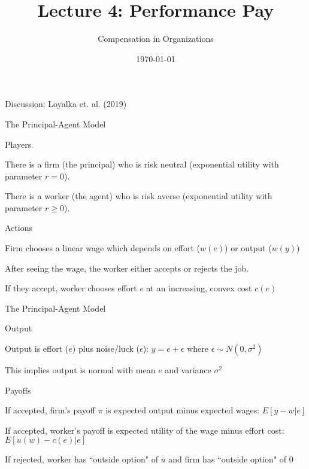 \documentclass[aspectratio=169,usenames,dvipsnames]{beamer}
\title[diss]{Lecture 4: Performance Pay} %
\author{Compensation in Organizations} %
\institute[shortinst]{Jacob Kohlhepp}
\date{\today} %
\newenvironment{wideitemize}{\itemize\addtolength{\itemsep}{10pt}}{\enditemize}
\begin{document}
\begin{frame}
\titlepage %

\end{frame}

\begin{frame}
\centering
    \huge Discussion: Loyalka et. al. (2019)
\end{frame}

\begin{frame}{The Principal-Agent Model}
\begin{block}{Players}
    \begin{wideitemize}
    \item There is a firm (the principal) who is risk neutral (exponential utility with parameter $r=0$).
    \item There is a worker (the agent) who is risk averse (exponential utility with parameter $r\geq 0$).
\end{wideitemize}
\end{block}
\begin{block}{Actions}
    \begin{wideitemize}
    \item Firm chooses a linear wage which depends on effort ($w(e)$) or output ($w(y)$)
    \item After seeing the wage, the worker either accepts or rejects the job.
    \item If they accept, worker chooses effort $e$ at an increasing, convex cost $c(e)$
\end{wideitemize}
\end{block}
\end{frame}
\begin{frame}{The Principal-Agent Model}
\begin{block}{Output}
    \begin{wideitemize}
    \item Output is effort ($e$) plus noise/luck ($\epsilon$): $y=e+\epsilon$ where $\epsilon\sim N(0,\sigma^2)$
    \item This implies output is normal with mean $e$ and variance $\sigma^2$
\end{wideitemize}
\end{block}
\begin{block}{Payoffs}
    \begin{wideitemize}
    \item If accepted, firm's payoff $\pi$ is expected output minus expected wages: $E[y-w|e]$
    \item If accepted, worker's payoff is expected utility of the wage minus effort cost: $E[u(w) -c(e)|e]$
    \item If rejected, worker has ``outside option" of $\bar u$ and firm has ``outside option" of 0
\end{wideitemize}
\end{block}
\end{frame}
\end{document}
